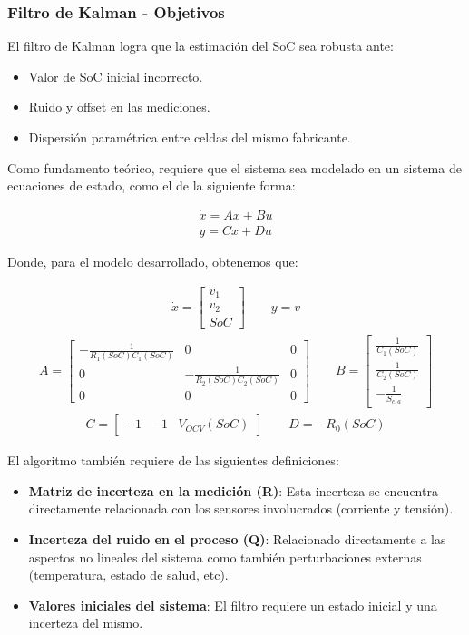 \documentclass[10pt]{beamer}
\theoremstyle{remark}
\theoremstyle{definition}
\begin{document}
\begin{frame}[allowframebreaks]
  \frametitle{Filtro de Kalman - Objetivos}
  El filtro de Kalman logra que la estimación del SoC sea robusta ante:
  \begin{itemize}
	\item Valor de SoC inicial incorrecto.
	\item Ruido y offset en las mediciones.
	\item Dispersión paramétrica entre celdas del mismo fabricante.
  \end{itemize}
  Como fundamento teórico, requiere que el sistema sea modelado en un sistema de
  ecuaciones de estado, como el de la siguiente forma:

  \begin{align*}
	\dot{x} = Ax + Bu \\
	y = Cx + Du
	\label{sse}
  \end{align*}

  \framebreak

  Donde, para el modelo desarrollado, obtenemos que:

  \begin{align*}
	\dot{x} = \begin{bmatrix} 
	  v_1\\
	  v_2\\
	  SoC
	\end{bmatrix}
	\qquad
	y = v
  \end{align*}
  \begin{align*}
	A = \begin{bmatrix}
	  -\frac{1}{R_1(SoC)C_1(SoC)} & 0 & 0\\
	  0 & -\frac{1}{R_2(SoC)C_2(SoC)} & 0\\
	  0 & 0 & 0
	\end{bmatrix}
	\qquad
	B = \begin{bmatrix}
	  \frac{1}{C_1(SoC)}\\
	  \frac{1}{C_2(SoC)}\\
	  -\frac{1}{S_{c, a}}
	\end{bmatrix}
  \end{align*}
  \begin{align*}
	C = \begin{bmatrix} -1 & -1 & V_{OCV}(SoC)\end{bmatrix} \qquad D = -R_0(SoC)
  \end{align*}
  \framebreak
	
  El algoritmo también requiere de las siguientes definiciones:
  \begin{itemize}
	\item \textbf{Matriz de incerteza en la medición (R)}: Esta incerteza se
	  encuentra directamente relacionada con los sensores involucrados
	  (corriente y tensión).
	\item \textbf{Incerteza del ruido en el proceso (Q)}: Relacionado
	  directamente a las aspectos no lineales del sistema como también
	  perturbaciones externas (temperatura, estado de salud, etc).
	\item \textbf{Valores iniciales del sistema}: El filtro requiere
	  un estado inicial y una incerteza del mismo.
  \end{itemize}
\end{frame}
\end{document}
